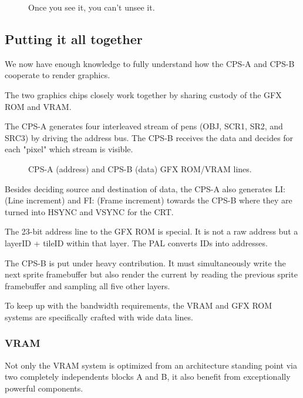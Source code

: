 \begin{figure}[H]
 \caption*{Once you see it, you can't unsee it.}%
 \end{figure}%



\subsection{Putting it all together}

We now have enough knowledge to fully understand how the CPS-A and CPS-B cooperate to render graphics.

The two graphics chips closely work together by sharing custody of the GFX ROM and VRAM. 


 The CPS-A generates four interleaved stream of pens (OBJ, SCR1, SR2, and SRC3) by driving the address bus.
  The CPS-B receives the data and decides for each "pixel" which stream is visible. 


\begin{figure}[H]
\caption*{CPS-A (address) and CPS-B (data) GFX ROM/VRAM lines.}
\end{figure}

Besides deciding source and destination of data, the CPS-A also generates LI: (Line increment) and FI: (Frame increment) towards the CPS-B where they are turned into HSYNC and VSYNC for the CRT.

The 23-bit address line to the GFX ROM is special. It is not a raw address but a layerID + tileID within that layer. The PAL  converts IDs into addresses.


The CPS-B is put under heavy contribution. It must simultaneously write the next sprite framebuffer but also render the current by reading the previous sprite framebuffer and sampling all five other layers.


To keep up with the bandwidth requirements, the VRAM and GFX ROM systems are specifically crafted with wide data lines.








\subsubsection{VRAM}
Not only the VRAM system is optimized from an architecture standing point via two completely independents blocks A and B, it also benefit from exceptionally powerful components.

